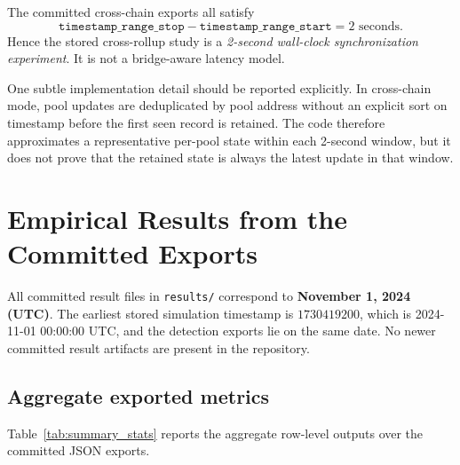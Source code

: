 \documentclass[11pt]{article}
\begin{document}
The committed cross-chain exports all satisfy
\[
\texttt{timestamp\_range\_stop} - \texttt{timestamp\_range\_start} = 2 \text{ seconds}.
\]
Hence the stored cross-rollup study is a \emph{2-second wall-clock synchronization experiment}. It is not a bridge-aware latency model.

One subtle implementation detail should be reported explicitly. In cross-chain mode, pool updates are deduplicated by pool address without an explicit sort on timestamp before the first seen record is retained. The code therefore approximates a representative per-pool state within each 2-second window, but it does not prove that the retained state is always the latest update in that window.

\section{Empirical Results from the Committed Exports}

All committed result files in \texttt{results/} correspond to \textbf{November 1, 2024 (UTC)}. The earliest stored simulation timestamp is \(1730419200\), which is 2024-11-01 00:00:00 UTC, and the detection exports lie on the same date. No newer committed result artifacts are present in the repository.

\subsection{Aggregate exported metrics}

Table~\ref{tab:summary_stats} reports the aggregate row-level outputs over the committed JSON exports.

\begin{table}[H]
\centering
\caption{Aggregate metrics over committed November 1, 2024 exports. Detection \emph{PnL rows} count only rows with numeric \texttt{total\_profit\_usd}.}
\label{tab:summary_stats}
\end{table}
\end{document}
